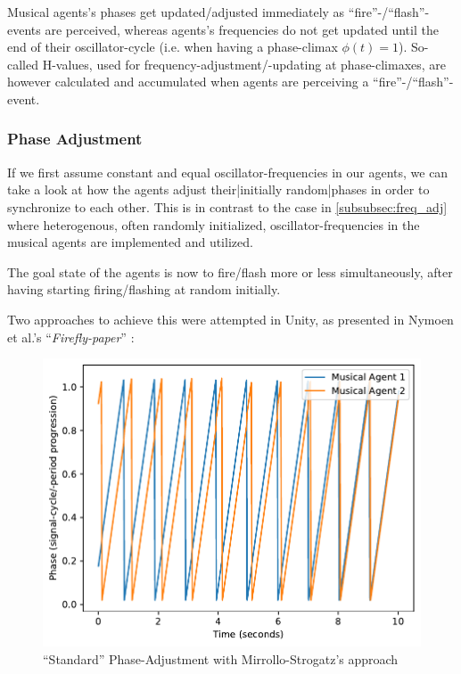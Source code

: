 	Musical agents's phases get updated/adjusted immediately as ``fire''-/``flash''-events are perceived, whereas agents's frequencies do not get updated until the end of their oscillator-cycle (i.e. when having a phase-climax $\phi(t)=1$). So-called H-values, used for frequency-adjustment/-updating at phase-climaxes, are however calculated and accumulated when agents are perceiving a ``fire''-/``flash''-event.
	
		\subsubsection{Phase Adjustment}
		\label{subsubsec:phase_adj}
			If we first assume constant and equal oscillator-frequencies in our agents, we can take a look at how the agents adjust their|initially random|phases in order to synchronize to each other. This is in contrast to the case in \ref{subsubsec:freq_adj} where heterogenous, often randomly initialized, oscillator-frequencies in the musical agents are implemented and utilized.
			
			The goal state of the agents is now to fire/flash more or less simultaneously, after having starting firing/flashing at random initially.
			
			Two approaches to achieve this were attempted in Unity, as presented in Nymoen et al.'s ``\textit{Firefly-paper}'' \cite{nymoen_synch}:
			
			
			\begin{figure}[h]
				\centering
				\includegraphics[width=0.9\linewidth]{Assets/Figures/MirolloStrogatzPhaseAdjustment.pdf}
				\caption{``Standard'' Phase-Adjustment with Mirrollo-Strogatz's approach}
				\label{fig:strog_phase}
			\end{figure}
			
